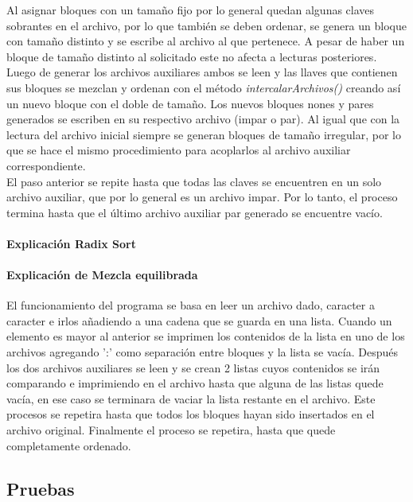 \documentclass{article}
\begin{document}
	Al asignar bloques con un tamaño fijo por lo general quedan algunas claves sobrantes en el archivo, por lo que también se deben ordenar, se 
	genera un bloque con tamaño distinto y se escribe al archivo al que pertenece. A pesar de haber un bloque de tamaño distinto al solicitado este 
	no afecta a lecturas posteriores.\\
	
	Luego de generar los archivos auxiliares ambos se leen y las llaves que contienen sus bloques se mezclan y ordenan con el método \textit{intercalarArchivos()} 
	creando así un nuevo bloque con el doble de tamaño. Los nuevos bloques nones y pares generados se escriben en su respectivo archivo (impar o par). 
	Al igual que con la lectura del archivo inicial siempre se generan bloques de tamaño irregular, por lo que se hace el mismo procedimiento para acoplarlos 
	al archivo auxiliar correspondiente.\\
	
	El paso anterior se repite hasta que todas las claves se encuentren en un solo archivo auxiliar, que por lo general es un archivo impar. 
	Por lo tanto, el proceso termina hasta que el último archivo auxiliar par generado se encuentre vacío.\\
	
	\paragraph*{Explicación Radix Sort}
	
	\paragraph*{Explicación de Mezcla equilibrada}
	El funcionamiento del programa se basa en leer un archivo dado, caracter a caracter e irlos añadiendo a una cadena que se guarda en una lista. 
	Cuando un elemento es mayor al anterior se imprimen los contenidos de la lista en uno de los archivos agregando ':' como separación entre bloques y la lista se vacía. 
	Después los dos archivos auxiliares se leen y se crean 2 listas cuyos contenidos se irán comparando e imprimiendo en el archivo hasta que alguna de las listas quede vacía, 
	en ese caso se terminara de vaciar la lista restante en el archivo. Este procesos se repetira hasta que todos los bloques hayan sido insertados en el archivo original. 
	Finalmente el proceso se repetira, hasta que quede completamente ordenado.
	
	\subsection{Pruebas}
\end{document}
